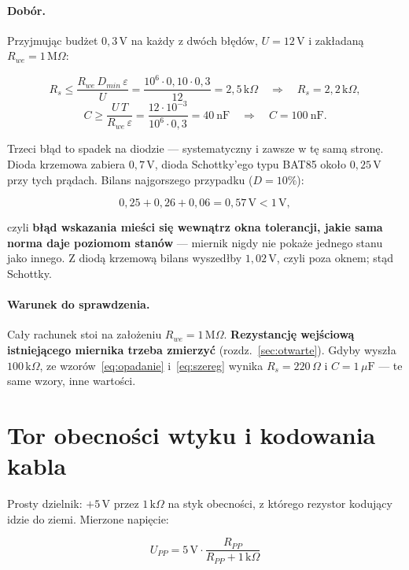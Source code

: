 \documentclass[a4paper,11pt]{article}
\newcommand{\ohm}{\,\Omega}
\newcommand{\kohm}{\,\mathrm{k}\Omega}
\newcommand{\Mohm}{\,\mathrm{M}\Omega}
\newcommand{\volt}{\,\mathrm{V}}
\begin{document}
\paragraph{Dobór.} Przyjmując budżet $0{,}3\volt$ na każdy z dwóch błędów,
$U=12\volt$ i zakładaną $R_{we}=1\Mohm$:

\[
R_s \le \frac{R_{we}\,D_{min}\,\varepsilon}{U}
     = \frac{10^6\cdot0{,}10\cdot0{,}3}{12}=2{,}5\kohm
\quad\Rightarrow\quad R_s = 2{,}2\kohm,
\]
\[
C \ge \frac{U\,T}{R_{we}\,\varepsilon}
   = \frac{12\cdot10^{-3}}{10^{6}\cdot0{,}3}=40\ \mathrm{nF}
\quad\Rightarrow\quad C = 100\ \mathrm{nF}.
\]

Trzeci błąd to spadek na diodzie --- systematyczny i zawsze w tę samą stronę.
Dioda krzemowa zabiera $0{,}7\volt$, dioda Schottky'ego typu BAT85 około
$0{,}25\volt$ przy tych prądach. Bilans najgorszego przypadku ($D=10\%$):

\[
0{,}25 + 0{,}26 + 0{,}06 = 0{,}57\volt < 1\volt ,
\]

czyli \textbf{błąd wskazania mieści się wewnątrz okna tolerancji, jakie sama norma
daje poziomom stanów} --- miernik nigdy nie pokaże jednego stanu jako innego.
Z diodą krzemową bilans wyszedłby $1{,}02\volt$, czyli poza oknem; stąd Schottky.

\paragraph{Warunek do sprawdzenia.} Cały rachunek stoi na założeniu
$R_{we}=1\Mohm$. \textbf{Rezystancję wejściową istniejącego miernika trzeba
zmierzyć} (rozdz.~\ref{sec:otwarte}). Gdyby wyszła $100\kohm$, ze
wzorów~\eqref{eq:opadanie} i~\eqref{eq:szereg} wynika $R_s=220\ohm$
i $C=1\,\mu\mathrm{F}$ --- te same wzory, inne wartości.

\section{Tor obecności wtyku i kodowania kabla}

Prosty dzielnik: $+5\volt$ przez $1\kohm$ na styk obecności, z którego rezystor
kodujący idzie do ziemi. Mierzone napięcie:

\begin{equation}
U_{PP}=5\volt\cdot\frac{R_{PP}}{R_{PP}+1\kohm}
\end{equation}
\end{document}
